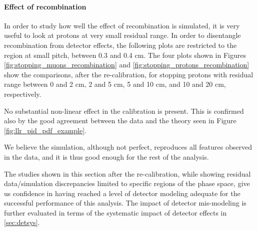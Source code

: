 \paragraph{Effect of recombination}
In order to study how well the effect of recombination is simulated, it is very useful to look at protons at very small residual range.
In order to disentangle recombination from detector effects, the following plots are restricted to the region at small pitch, between 0.3 and 0.4 cm.
The four plots shown in Figures \ref{fig:stopping_muons_recombination} and \ref{fig:stopping_protons_recombination} show the comparisons, after the re-calibration, for stopping protons with residual range between 0 and 2 cm, 2 and 5 cm, 5 and 10 cm, and 10 and 20 cm, respectively.

No substantial non-linear effect in the calibration is present.
This is confirmed also by the good agreement between the data and the theory seen in Figure \ref{fig:llr_pid_pdf_example}.

We believe the simulation, although not perfect, reproduces all features observed in the data, and it is thus good enough for the rest of the analysis.

The studies shown in this section after the re-calibration, while showing residual data/simulation discrepancies limited to specific regions of the phase space, give us confidence in having reached a level of detector modeling adequate for the successful performance of this analysis. 
The impact of detector mis-modeling is further evaluated in terms of the systematic impact of detector effects in \ref{sec:detsys}.

